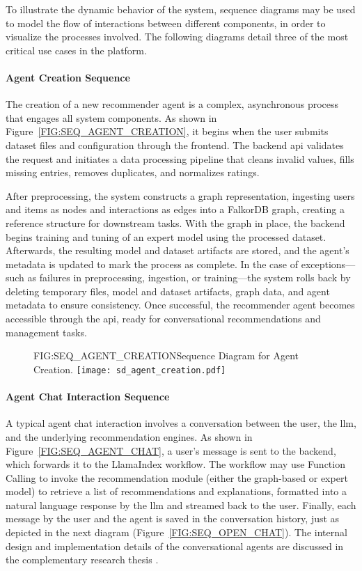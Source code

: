 To illustrate the dynamic behavior of the system, sequence diagrams may be used to model the flow of interactions between different components, in order to visualize the processes involved. The following diagrams detail three of the most critical use cases in the platform.

\paragraph{Agent Creation Sequence}
The creation of a new recommender agent is a complex, asynchronous process that engages all system components. As shown in Figure~\ref{FIG:SEQ_AGENT_CREATION}, it begins when the user submits dataset files and configuration through the frontend. The backend \acs{api} validates the request and initiates a data processing pipeline that cleans invalid values, fills missing entries, removes duplicates, and normalizes ratings. 

After preprocessing, the system constructs a graph representation, ingesting users and items as nodes and interactions as edges into a FalkorDB graph, creating a reference structure for downstream tasks. With the graph in place, the backend begins training and tuning of an expert model using the processed dataset. Afterwards, the resulting model and dataset artifacts are stored, and the agent's metadata is updated to mark the process as complete. In the case of exceptions---such as failures in preprocessing, ingestion, or training---the system rolls back by deleting temporary files, model and dataset artifacts, graph data, and agent metadata to ensure consistency. Once successful, the recommender agent becomes accessible through the \acs{api}, ready for conversational recommendations and management tasks.

\newpage

\begin{figure}[Sequence Diagram for Agent Creation]{FIG:SEQ_AGENT_CREATION}{Sequence Diagram for Agent Creation.}
    \texttt{[image: sd\_agent\_creation.pdf]}
\end{figure}

\paragraph{Agent Chat Interaction Sequence}
A typical agent chat interaction involves a conversation between the user, the \ac{llm}, and the underlying recommendation engines. As shown in Figure~\ref{FIG:SEQ_AGENT_CHAT}, a user's message is sent to the backend, which forwards it to the LlamaIndex workflow. The workflow may use Function Calling to invoke the recommendation module (either the graph-based or expert model) to retrieve a list of recommendations and explanations, formatted into a natural language response by the \ac{llm} and streamed back to the user. Finally, each message by the user and the agent is saved in the conversation history, just as depicted in the next diagram (Figure~\ref{FIG:SEQ_OPEN_CHAT}). The internal design and implementation details of the conversational agents are discussed in the complementary research thesis \cite{MUI2ICSI_THESIS}.

